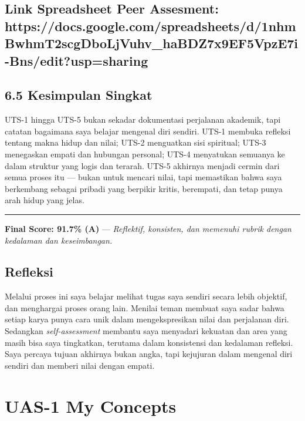 \documentclass[
  letterpaper,
  DIV=11,
  numbers=noendperiod]{scrreprt}
\begin{document}
\section{Link Spreadsheet Peer Assesment:
https://docs.google.com/spreadsheets/d/1nhmBwhmT2scgDboLjVuhv\_haBDZ7x9EF5VpzE7i-Bns/edit?usp=sharing}\label{link-spreadsheet-peer-assesment-httpsdocs.google.comspreadsheetsd1nhmbwhmt2scgdboljvuhv_habdz7x9ef5vpze7i-bnsedituspsharing}

\section{6.5 Kesimpulan Singkat}\label{kesimpulan-singkat}

UTS-1 hingga UTS-5 bukan sekadar dokumentasi perjalanan akademik, tapi
catatan bagaimana saya belajar mengenal diri sendiri. UTS-1 membuka
refleksi tentang makna hidup dan nilai; UTS-2 menguatkan sisi spiritual;
UTS-3 menegaskan empati dan hubungan personal; UTS-4 menyatukan semuanya
ke dalam struktur yang logis dan terarah. UTS-5 akhirnya menjadi cermin
dari semua proses itu --- bukan untuk mencari nilai, tapi memastikan
bahwa saya berkembang sebagai pribadi yang berpikir kritis, berempati,
dan tetap punya arah hidup yang jelas.

\begin{center}\rule{0.5\linewidth}{0.5pt}\end{center}

\textbf{Final Score: 91.7\% (A)} --- \emph{Reflektif, konsisten, dan
memenuhi rubrik dengan kedalaman dan keseimbangan.}

\section{Refleksi}\label{refleksi-1}

Melalui proses ini saya belajar melihat tugas saya sendiri secara lebih
objektif, dan menghargai proses orang lain. Menilai teman membuat saya
sadar bahwa setiap karya punya cara unik dalam mengekspresikan nilai dan
perjalanan diri. Sedangkan \emph{self-assessment} membantu saya
menyadari kekuatan dan area yang masih bisa saya tingkatkan, terutama
dalam konsistensi dan kedalaman refleksi. Saya percaya tujuan akhirnya
bukan angka, tapi kejujuran dalam mengenal diri sendiri dan memberi
nilai dengan empati.


\chapter{UAS-1 My Concepts}\label{uas-1-my-concepts}
\end{document}
